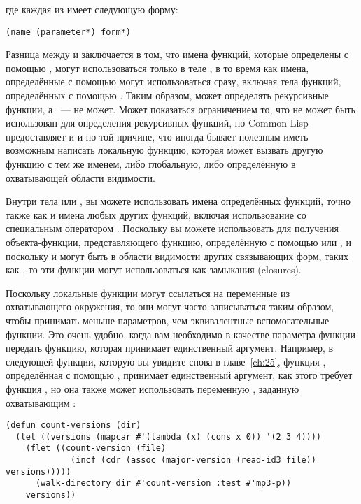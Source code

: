 где каждая из  имеет следующую форму:

\begin{lstlisting}
(name (parameter*) form*)
\end{lstlisting}

Разница между  и  заключается в том, что имена функций, которые
определены с помощью , могут использоваться только в теле , в то
время как имена, определённые с помощью  могут использоваться сразу, включая
тела функций, определённых с помощью . Таким образом,  может
определять рекурсивные функции, а ~--- не может.  Может показаться ограничением
то, что  не может быть использован для определения рекурсивных функций, но
Common Lisp предоставляет и  и  по той причине, что иногда бывает
полезным иметь возможным написать локальную функцию, которая может вызвать другую функцию
с тем же именем, либо глобальную, либо определённую в охватывающей области видимости.

Внутри тела  или , вы можете использовать имена определённых
функций, точно также как и имена любых других функций, включая использование со
специальным оператором .  Поскольку вы можете использовать 
для получения объекта-функции, представляющего функцию, определённую с помощью 
или , и поскольку  и  могут быть в области видимости
других связывающих форм, таких как , то эти функции могут использоваться как
замыкания (closures).

Поскольку локальные функции могут ссылаться на переменные из охватывающего окружения, то
они могут часто записываться таким образом, чтобы принимать меньше параметров, чем
эквивалентные вспомогательные функции.  Это очень удобно, когда вам необходимо в качестве
параметра-функции передать функцию, которая принимает единственный аргумент. Например, в
следующей функции, которую вы увидите снова в главе~\ref{ch:25}, функция
, определённая с помощью , принимает единственный аргумент,
как этого требует функция , но она также может использовать
переменную , заданную охватывающим :

\begin{lstlisting}
(defun count-versions (dir)
  (let ((versions (mapcar #'(lambda (x) (cons x 0)) '(2 3 4))))
    (flet ((count-version (file)
             (incf (cdr (assoc (major-version (read-id3 file)) versions)))))
      (walk-directory dir #'count-version :test #'mp3-p))
    versions))
\end{lstlisting}

